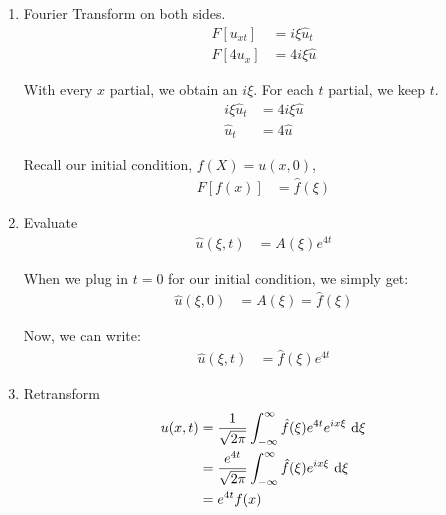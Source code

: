 \begin{enumerate}
  \item Fourier Transform on both sides.
  \begin{align}
    F[u_{xt}] & = i \xi \hat u_t\\
    F[4u_x] & = 4 i \xi \hat u
  \end{align}

  With every $x$ partial, we obtain an $i \xi$. For each $t$ partial, we keep $t$.
  \begin{align}
    i \xi \hat u_t & = 4 i \xi \hat u\\
    \hat u_t & = 4 \hat u
  \end{align}

  Recall our initial condition, $f(X) = u(x, 0)$,
  \begin{align}
    F[f(x)] & = \hat f(\xi)
  \end{align}

  \item Evaluate
  \begin{align}
    \hat u(\xi, t) & = A(\xi) e^{4t}
  \end{align}

  When we plug in $t = 0$ for our initial condition, we simply get:
  \begin{align}
    \hat u(\xi, 0) & = A(\xi) = \hat f(\xi)
  \end{align}

  Now, we can write:
  \begin{align}
    \hat u(\xi, t) & = \hat f(\xi) e^{4t}
  \end{align}

  \item Retransform
  \begin{align}
    u(x, t) & = \frac{1}{\sqrt{2 \pi}}
    \int^\infty_{-\infty} \hat f(\xi) e^{4t} e^{i x \xi}\ \text d\xi\\
    & = \frac{e^{4t}}{\sqrt{2 \pi}}
    \int^\infty_{-\infty} \hat f(\xi) e^{i x \xi}\ \text d \xi\\
    & = e^{4t} f(x)
  \end{align}
\end{enumerate}
